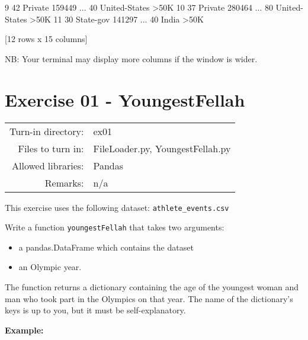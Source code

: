\documentclass[]{article}
\newenvironment{Shaded}{\begin{snugshade}}{\end{snugshade}}
\newcommand{\DecValTok}[1]{\textcolor[rgb]{0.96,0.45,0.00}{#1}}
\newcommand{\NormalTok}[1]{\textcolor[rgb]{0.81,0.81,0.76}{#1}}
\newcommand{\OperatorTok}[1]{\textcolor[rgb]{0.81,0.81,0.76}{#1}}
\begin{document}
\begin{Shaded}
\begin{Highlighting}[]
\DecValTok{9}    \DecValTok{42}\NormalTok{           Private  }\DecValTok{159449}\NormalTok{  ...             }\DecValTok{40}\NormalTok{   United}\OperatorTok{-}\NormalTok{States   }\OperatorTok{>}\NormalTok{50K}
\DecValTok{10}   \DecValTok{37}\NormalTok{           Private  }\DecValTok{280464}\NormalTok{  ...             }\DecValTok{80}\NormalTok{   United}\OperatorTok{-}\NormalTok{States   }\OperatorTok{>}\NormalTok{50K}
\DecValTok{11}   \DecValTok{30}\NormalTok{         State}\OperatorTok{-}\NormalTok{gov  }\DecValTok{141297}\NormalTok{  ...             }\DecValTok{40}\NormalTok{           India   }\OperatorTok{>}\NormalTok{50K}

\NormalTok{[}\DecValTok{12}\NormalTok{ rows x }\DecValTok{15}\NormalTok{ columns]}
\end{Highlighting}
\end{Shaded}

NB: Your terminal may display more columns if the window is wider.

\clearpage

\hypertarget{exercise-01---youngestfellah-1}{%
\section{Exercise 01 -
YoungestFellah}\label{exercise-01---youngestfellah-1}}

\begin{longtable}[]{@{}rl@{}}
\toprule
\endhead
Turn-in directory: & ex01\tabularnewline
Files to turn in: & FileLoader.py, YoungestFellah.py\tabularnewline
Allowed libraries: & Pandas\tabularnewline
Remarks: & n/a\tabularnewline
\bottomrule
\end{longtable}

This exercise uses the following dataset: \texttt{athlete\_events.csv}

Write a function \texttt{youngestFellah} that takes two arguments:

\begin{itemize}
\item
  a pandas.DataFrame which contains the dataset
\item
  an Olympic year.
\end{itemize}

The function returns a dictionary containing the age of the youngest
woman and man who took part in the Olympics on that year. The name of
the dictionary's keys is up to you, but it must be self-explanatory.

\textbf{Example:}
\end{document}
